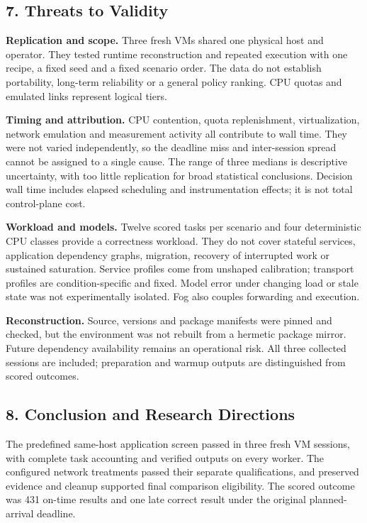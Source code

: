 \documentclass[11pt,a4paper]{article}
\begin{document}
\subsection{7. Threats to Validity}\label{threats-to-validity}

\textbf{Replication and scope.} Three fresh VMs shared one physical host
and operator. They tested runtime reconstruction and repeated execution
with one recipe, a fixed seed and a fixed scenario order. The data do
not establish portability, long-term reliability or a general policy
ranking. CPU quotas and emulated links represent logical tiers.

\textbf{Timing and attribution.} CPU contention, quota replenishment,
virtualization, network emulation and measurement activity all
contribute to wall time. They were not varied independently, so the
deadline miss and inter-session spread cannot be assigned to a single
cause. The range of three medians is descriptive uncertainty, with too
little replication for broad statistical conclusions. Decision wall time
includes elapsed scheduling and instrumentation effects; it is not total
control-plane cost.

\textbf{Workload and models.} Twelve scored tasks per scenario and four
deterministic CPU classes provide a correctness workload. They do not
cover stateful services, application dependency graphs, migration,
recovery of interrupted work or sustained saturation. Service profiles
come from unshaped calibration; transport profiles are
condition-specific and fixed. Model error under changing load or stale
state was not experimentally isolated. Fog also couples forwarding and
execution.

\Needspace{65pt}

\textbf{Reconstruction.} Source, versions and package manifests were
pinned and checked, but the environment was not rebuilt from a hermetic
package mirror. Future dependency availability remains an operational
risk. All three collected sessions are included; preparation and warmup
outputs are distinguished from scored outcomes.

\subsection{8. Conclusion and Research
Directions}\label{conclusion-and-research-directions}

The predefined same-host application screen passed in three fresh VM
sessions, with complete task accounting and verified outputs on every
worker. The configured network treatments passed their separate
qualifications, and preserved evidence and cleanup supported final
comparison eligibility. The scored outcome was 431 on-time results and
one late correct result under the original planned-arrival deadline.
\end{document}

